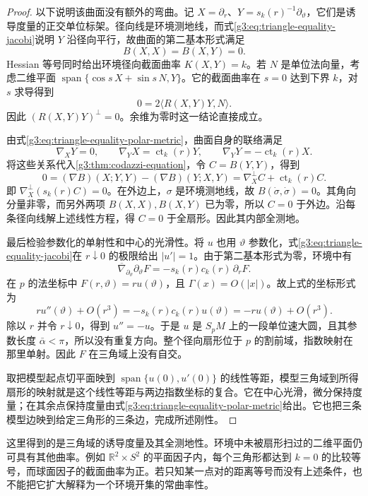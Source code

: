 \begin{proof}
 以下说明该曲面没有额外的弯曲。记
 \(X=\partial_r\)、\(Y=s_k(r)^{-1}\partial_\vartheta\)，它们是诱导度量的正交单位标架。径向线是环境测地线，而式\eqref{g3:eq:triangle-equality-jacobi}说明 \(Y\) 沿径向平行，故曲面的第二基本形式满足
 \[
 B(X,X)=B(X,Y)=0.
 \]
 Hessian 等号同时给出环境径向截面曲率 \(K(X,Y)=k\)。若 \(N\) 是单位法向量，考虑二维平面
 \(\operatorname{span}\{\cos s\,X+\sin s\,N,Y\}\)。它的截面曲率在 \(s=0\) 达到下界 \(k\)，对 \(s\) 求导得到
 \[
 0=2\langle R(X,Y)Y,N\rangle.
 \]
 因此 \((R(X,Y)Y)^\perp=0\)。余维为零时这一结论直接成立。

 由式\eqref{g3:eq:triangle-equality-polar-metric}，曲面自身的联络满足
 \[
 \nabla_XY=0,\qquad \nabla_YX=\operatorname{ct}_k(r)Y,
 \qquad \nabla_YY=-\operatorname{ct}_k(r)X.
 \]
 将这些关系代入\cref{g3:thm:codazzi-equation}，令 \(C=B(Y,Y)\)，得到
 \[
 0=(\nabla B)(X;Y,Y)-(\nabla B)(Y;X,Y)
   =\nabla_X^\perp C+\operatorname{ct}_k(r)C.
 \]
 即 \(\nabla_X^\perp(s_k(r)C)=0\)。在外边上，\(\sigma\) 是环境测地线，故 \(B(\dot\sigma,\dot\sigma)=0\)。其角向分量非零，而另外两项 \(B(X,X),B(X,Y)\) 已为零，所以 \(C=0\) 于外边。沿每条径向线解上述线性方程，得 \(C=0\) 于全扇形。因此其内部全测地。

 最后检验参数化的单射性和中心的光滑性。将 \(u\) 也用 \(\vartheta\) 参数化，式\eqref{g3:eq:triangle-equality-jacobi}在 \(r\downarrow0\) 的极限给出 \(|u'|=1\)。由于第二基本形式为零，环境中有
 \[
 \overline\nabla_{\partial_\vartheta}\partial_\vartheta F
   =-s_k(r)c_k(r)\,\partial_rF.
 \]
 在 \(p\) 的法坐标中 \(F(r,\vartheta)=ru(\vartheta)\)，且 \(\Gamma(x)=O(|x|)\)。故上式的坐标形式为
 \[
 r u''(\vartheta)+O(r^3)
   =-s_k(r)c_k(r)u(\vartheta)=-r u(\vartheta)+O(r^3).
 \]
 除以 \(r\) 并令 \(r\downarrow0\)，得到 \(u''=-u\)。于是 \(u\) 是 \(S_pM\) 上的一段单位速大圆，且其参数长度 \(\bar\alpha<\pi\)，所以没有重复方向。整个径向扇形位于 \(p\) 的割前域，指数映射在那里单射。因此 \(F\) 在三角域上没有自交。

 取把模型起点切平面映到 \(\operatorname{span}\{u(0),u'(0)\}\) 的线性等距，模型三角域到所得扇形的映射就是这个线性等距与两边指数坐标的复合。它在中心光滑，微分保持度量；在其余点保持度量由式\eqref{g3:eq:triangle-equality-polar-metric}给出。它也把三条模型边映到给定三角形的三条边，完成所述刚性。
\end{proof}

这里得到的是三角域的诱导度量及其全测地性。环境中未被扇形扫过的二维平面仍可具有其他曲率。例如 \(\mathbb R^2\times S^2\) 的平面因子内，每个三角形都达到 \(k=0\) 的比较等号，而球面因子的截面曲率为正。若只知某一点对的距离等号而没有上述条件，也不能把它扩大解释为一个环境开集的常曲率性。
